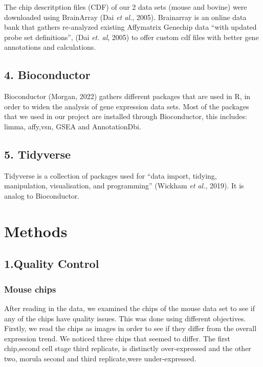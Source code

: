 \documentclass[
  parskip,
  oneside]{scrreprt}
\begin{document}
The chip descritption files (CDF) of our 2 data sets (mouse and bovine)
were downloaded using BrainArray (Dai \emph{et al.}, 2005). Brainarray
is an online data bank that gathers re-analyzed existing Affymatrix
Genechip data ``with updated probe set definitions'', (Dai \emph{et.
al}, 2005) to offer custom cdf files with better gene annotations and
calculations.

\hypertarget{bioconductor}{%
\section{4. Bioconductor}\label{bioconductor}}

Bioconductor (Morgan, 2022) gathers different packages that are used in
R, in order to widen the analysis of gene expression data sets. Most of
the packages that we used in our project are installed through
Bioconductor, this includes: limma, affy,vsn, GSEA and AnnotationDbi.

\hypertarget{tidyverse}{%
\section{5. Tidyverse}\label{tidyverse}}

Tidyverse is a collection of packages used for ``data import, tidying,
manipulation, visualisation, and programming'' (Wickham \emph{et al.},
2019). It is analog to Bioconductor.

\hypertarget{methods}{%
\chapter{Methods}\label{methods}}

\hypertarget{quality-control}{%
\section{1.Quality Control}\label{quality-control}}

\hypertarget{mouse-chips}{%
\subsection{Mouse chips}\label{mouse-chips}}

After reading in the data, we examined the chips of the mouse data set
to see if any of the chips have quality issues. This was done using
different objectives. Firstly, we read the chips as images in order to
see if they differ from the overall expression trend. We noticed three
chips that seemed to differ. The first chip,second cell stage third
replicate, is distinctly over-expressed and the other two, morula second
and third replicate,were under-expressed.
\end{document}
